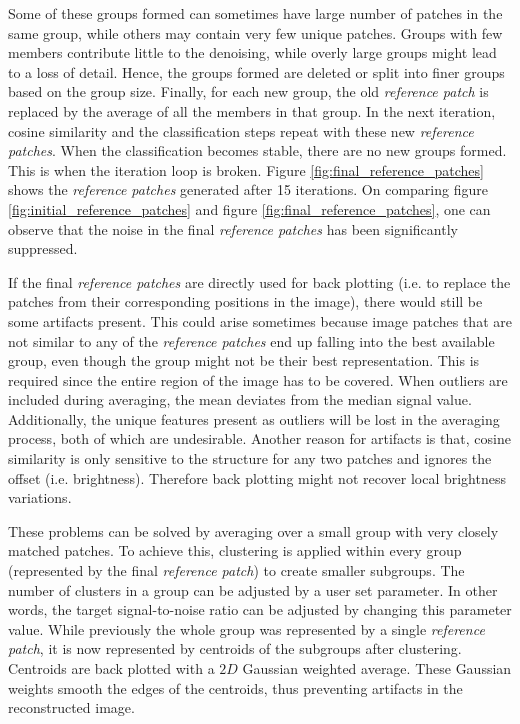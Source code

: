 \documentclass[fleqn,10pt]{wlscirep}
\begin{document}
	Some of these groups formed can sometimes have large number of patches in the same group, while others may contain very few unique patches. Groups with few members contribute little to the denoising, while overly large groups might lead to a loss of detail. Hence, the groups formed are deleted or split into finer groups based on the group size. Finally, for each new group, the old \textit{reference patch} is replaced by the average of all the members in that group. In the next iteration, cosine similarity and the classification steps repeat with these new \textit{reference patches}. When the classification becomes stable, there are no new groups formed. This is when the iteration loop is broken. Figure \ref{fig:final_reference_patches} shows the \textit{reference patches} generated after 15 iterations. On comparing figure \ref{fig:initial_reference_patches} and figure \ref{fig:final_reference_patches}, one can observe that the noise in the final \textit{reference patches} has been significantly suppressed.


	
	If the final \textit{reference patches} are directly used for back plotting (i.e. to replace the patches from their corresponding positions in the image), there would still be some artifacts present. This could arise sometimes because image patches that are not similar to any of the \textit{reference patches} end up falling into the best available group, even though the group might not be their best representation. This is required since the entire region of the image has to be covered. When outliers are included during averaging, the mean deviates from the median signal value. Additionally, the unique features present as outliers will be lost in the averaging process, both of which are undesirable. Another reason for artifacts is that, cosine similarity is only sensitive to the structure for any two patches and ignores the offset (i.e. brightness). Therefore back plotting might not recover local brightness variations.
	
	These problems can be solved by averaging over a small group with very closely matched patches. To achieve this, clustering is applied within every group (represented by the final \textit{reference patch}) to create smaller subgroups. The number of clusters in a group can be adjusted by a user set parameter. In other words, the target signal-to-noise ratio can be adjusted by changing this parameter value. While previously the whole group was represented by a single \textit{reference patch}, it is now represented by centroids of the subgroups after clustering. Centroids are back plotted with a $2D$ Gaussian weighted average. These Gaussian weights smooth the edges of the centroids, thus preventing artifacts in the reconstructed image. 
	
\end{document}
